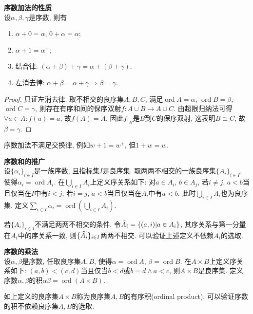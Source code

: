 \begin{pro}\textbf{序数加法的性质}\\
设$\alpha,\beta, \gamma$是序数, 则有
\begin{enumerate}
\item $\alpha+0=\alpha$, $0+\alpha=\alpha$;
\item $\alpha+1=\alpha^+$;
\item 结合律: $(\alpha+\beta)+\gamma = \alpha+(\beta+\gamma)$.
\item 左消去律: $\alpha+\beta=\alpha+\gamma \Rightarrow \beta=\gamma$.
\end{enumerate}
\end{pro}
\begin{proof}
只证左消去律. 取不相交的良序集$A,B,C$, 满足$\operatorname{ord}A=\alpha$, $\operatorname{ord}B=\beta$, $\operatorname{ord}C=\gamma$, 则存在有序和间的保序双射$f:A\cup B \to A\cup C$. 由超限归纳法可得$\forall a\in A: f(a)=a$, 故$f(A)=A$. 因此$f|_B$是$B$到$C$的保序双射, 这表明$B\cong C$, 故$\beta=\gamma$. 
\end{proof}
序数加法不满足交换律, 例如$w+1=w^+$, 但$1+w=w$. 

\begin{dfn} \textbf{序数和的推广}\\
设$\{\alpha_i\}_{i\in I}$是一族序数, 且指标集$I$是良序集. 取两两不相交的一族良序集$\{A_i\}_{i\in I}$, 使得$\alpha_i=\operatorname{ord}A_i$. 在$\bigcup_{i\in I} A_i$上定义序关系如下: 对$a\in A_i$, $b\in A_j$, 若$i\neq j$, $a<b$当且仅当在$I$中有$i<j$; 若$i=j$, $a<b$当且仅当在$A_i$中有$a<b$. 此时$\bigcup_{i\in I} A_i$也为良序集. 定义$\sum_{i\in I} \alpha_i=\operatorname{ord}\left(\bigcup_{i\in I} A_i\right)$. 
\end{dfn}
\par 若$\{A_i\}_{i\in I}$不满足两两不相交的条件, 令$\Tilde{A}_i=\{(a,i)\vert a\in A_i\}$, 其序关系与第一分量在$A_i$中的序关系一致, 则$\{\Tilde{A}_i\}_{i\in I}$两两不相交. 可以验证上述定义不依赖$A_i$的选取. 

\begin{dfn} \textbf{序数的乘法}\\
设$\alpha,\beta$是序数, 任取良序集$A,B$, 使得$\alpha=\operatorname{ord}A$, $\beta=\operatorname{ord}B$. 在$A\times B$上定义序关系如下: $(a,b)<(c,d)$当且仅当$b<d$或$b=d\land a<c$, 则$A\times B$是良序集. 定义序数$\alpha,\beta$的积$\alpha\beta=\operatorname{ord}(A\times B)$. 
\end{dfn}
如上定义的良序集$A\times B$称为良序集$A,B$的有序积(ordinal product). 可以验证序数的积不依赖良序集$A,B$的选取. 

